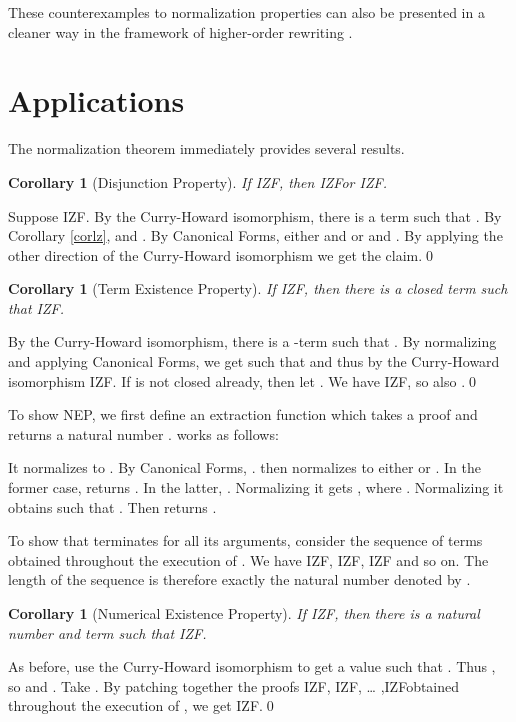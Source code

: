 \documentclass{LMCS}
\newtheorem{corollary}[thm]{Corollary}
\newcommand{\iizfr}{IZF}
\begin{document}
These counterexamples to normalization properties can also be presented in a
cleaner way in the framework of higher-order rewriting \cite{jawst2006}. 

\section{Applications}\label{secapp}

The normalization theorem immediately provides several results. 

\begin{corollary}[Disjunction Property]
If \iizfr , then \iizfr  or \iizfr . 
\end{corollary}
\proof Suppose \iizfr . By the Curry-Howard isomorphism, there is a
 term  such that . By Corollary
\ref{corlz},  and . By
Canonical Forms, either  and  or 
and . By applying the other direction of the Curry-Howard isomorphism
we get the claim.\qed


\begin{corollary}[Term Existence Property]
If \iizfr , then there is a closed term  such that \iizfr . 
\end{corollary}
\proof By the Curry-Howard isomorphism, there is a -term  such that . By normalizing  and applying
Canonical Forms, we get  such that  and thus by
the Curry-Howard isomorphism \iizfr . If  is not closed already, 
then let . We have \iizfr ,
so also .\qed


To show NEP, we first define an extraction function  
which takes a proof  and returns a natural number .
 works as follows:

It normalizes  to . By Canonical Forms, .  then normalizes  to
either  or . In the former case,  returns . In the
latter, . Normalizing  it
gets , where . Normalizing
 it obtains  such that . Then  returns . 

To show that  terminates for all its arguments, consider the
sequence  of
terms  obtained throughout the execution of .
We have \iizfr , \iizfr , \iizfr 
and so on. The length of the sequence is therefore exactly the natural
number denoted by . 

\begin{corollary}[Numerical Existence Property]
If \iizfr , then there is a natural number
 and term  such that \iizfr . 
\end{corollary}
\proof As before, use the Curry-Howard isomorphism to get a value  such that . Thus , so  and .
Take . By patching together
the proofs \iizfr , \iizfr , {\ldots}
,\iizfr  obtained throughout the execution of , we get \iizfr .\qed
\end{document}
